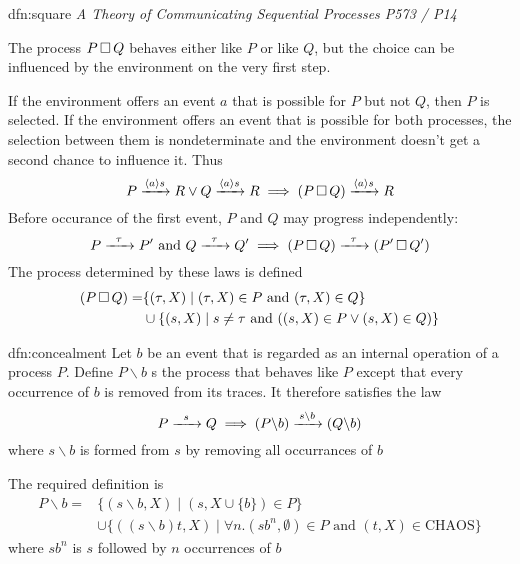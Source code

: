 \documentclass{article}
\begin{document}
\begin{dfn}{dfn:square}{}
    \textit{A Theory of Communicating Sequential Processes P573 / P14}

    The process $P \,\square\, Q$ behaves either like $P$ or like $Q$, but the choice can be influenced by the environment on the very first step.

    If the environment offers an event $a$ that is possible for $P$ but not $Q$, then $P$ is selected. If the environment offers an event that is possible for both processes, the selection between them is nondeterminate and the environment doesn't get a second chance to influence it. Thus
    \[P \prightarrow{\langle a \rangle s} R \vee Q \prightarrow{\langle a \rangle s} R \implies (P \detcomp Q) \prightarrow{\langle a \rangle s} R \]
    Before occurance of the first event, $P$ and $Q$ may progress independently:
    \[P \prightarrow{\tau} P' \text{ and } Q \prightarrow{\tau} Q' \implies (P \detcomp Q) \prightarrow{\tau} (P' \detcomp Q')\]
    The process determined by these laws is defined
    \begin{align*}
        (P \,\square\, Q) = &\{(\tau, X) \mid (\tau, X) \in P \text{ and } (\tau, X) \in Q\}\\
                         & \cup \{(s, X) \mid s \ne \tau \text{ and } ((s, X)\in P \vee (s, X)\in Q)\}
    \end{align*}
\end{dfn}

\begin{dfn}[Concealment]{dfn:concealment}{}
    Let $b$ be an event that is regarded as an internal operation of a process $P$. Define $P \backslash b$ s the process that behaves like $P$ except that every occurrence of $b$ is removed from its traces. It therefore satisfies the law
    \[P \prightarrow{s} Q \implies (P \backslash b) \prightarrow{s\backslash b}(Q \backslash b)\]
    where $s \backslash b$ is formed from $s$ by removing all occurrances of $b$
    
    The required definition is
    \begin{align*}
        P \backslash b = & \{(s \backslash b, X) \mid (s, X \cup \{b\})\in P\}\\
                         &\cup \{((s \backslash b) t, X) \mid \forall n.(sb^{n}, \emptyset)\in P \text{ and } (t, X)\in \mathrm{CHAOS}\}
    \end{align*}
    where $sb^{n}$ is $s$ followed by $n$ occurrences of $b$
\end{dfn}
\end{document}
